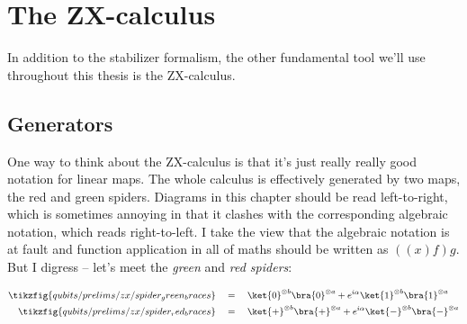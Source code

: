 \section{The ZX-calculus}\label{sec:the-zx-calculus}

In addition to the stabilizer formalism, the other fundamental tool we'll use throughout this thesis is the ZX-calculus.

\subsection{Generators}

One way to think about the ZX-calculus is that it's just really really good notation for linear maps.
The whole calculus is effectively generated by two maps, the red and green spiders.
Diagrams in this chapter should be read left-to-right, which is sometimes annoying in that it clashes with the corresponding algebraic notation, which reads right-to-left.
I take the view that the algebraic notation is at fault and function application in all of maths should be written as $((x)f)g$.
But I digress -- let's meet the \textit{green} and \textit{red spiders}:

\begin{align}\label{eq:green_spider_defn}
    \tikzfig{qubits/prelims/zx/spider_green_braces}
    \quad &= \quad
    \ket{0}^{\otimes b}\bra{0}^{\otimes a} + e^{i\alpha}\ket{1}^{\otimes b}\bra{1}^{\otimes a} \\
    \tikzfig{qubits/prelims/zx/spider_red_braces}
    \quad &= \quad
    \ket{+}^{\otimes b}\bra{+}^{\otimes a} + e^{i\alpha}\ket{-}^{\otimes b}\bra{-}^{\otimes a}
\end{align}

